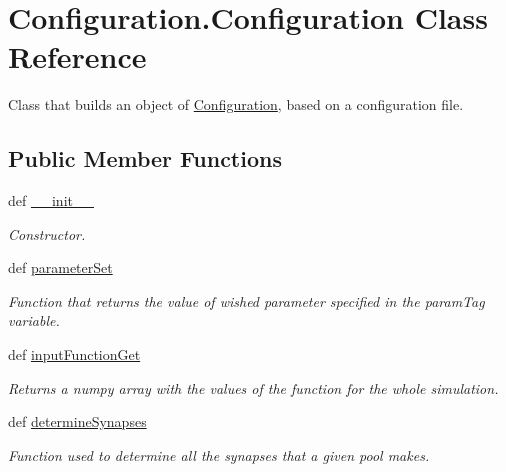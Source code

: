 \hypertarget{class_configuration_1_1_configuration}{\section{Configuration.\-Configuration Class Reference}
\label{class_configuration_1_1_configuration}
}


Class that builds an object of \hyperlink{class_configuration_1_1_configuration}{Configuration}, based on a configuration file.  


\subsection*{Public Member Functions}
\begin{DoxyCompactItemize}
\item 
def \hyperlink{class_configuration_1_1_configuration_af834fc08a3bb0f94184988cef9298691}{\-\_\-\-\_\-init\-\_\-\-\_\-}
\begin{DoxyCompactList}\small\item\em Constructor. \end{DoxyCompactList}\item 
def \hyperlink{class_configuration_1_1_configuration_a67eeb73e7a40b8b060e242df3dcc3518}{parameter\-Set}
\begin{DoxyCompactList}\small\item\em Function that returns the value of wished parameter specified in the param\-Tag variable. \end{DoxyCompactList}\item 
def \hyperlink{class_configuration_1_1_configuration_a590029f6dd5b22113bd6cc40e641ed9b}{input\-Function\-Get}
\begin{DoxyCompactList}\small\item\em Returns a numpy array with the values of the function for the whole simulation. \end{DoxyCompactList}\item 
def \hyperlink{class_configuration_1_1_configuration_aef3bdd8d00baa7835588ca008d480cee}{determine\-Synapses}
\begin{DoxyCompactList}\small\item\em Function used to determine all the synapses that a given pool makes. \end{DoxyCompactList}\end{DoxyCompactItemize}
